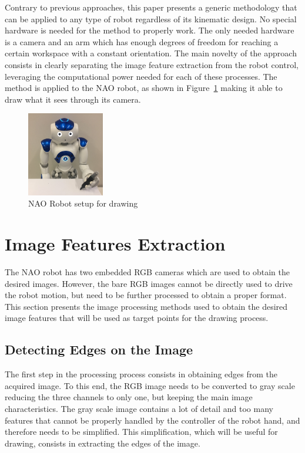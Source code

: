 \documentclass[conference]{IEEEtran}
\begin{document}
Contrary to previous approaches, this paper presents a generic methodology that can be applied to any type of robot regardless of its kinematic design. No special hardware is needed for the method to properly work. The only needed hardware is a camera and an arm which has enough degrees of freedom for reaching a certain workspace with a constant orientation. The main novelty of the approach consists in clearly separating the image feature extraction from the robot control, leveraging the computational power needed for each of these processes. The method is applied to the NAO robot, as shown in Figure~\ref{fig:nao} making it able to draw what it sees through its camera.
\begin{figure}
  \centering
  \captionsetup{font=footnotesize}
  \includegraphics[width=0.3\textwidth]{nao-setup.jpg}
  \caption{NAO Robot setup for drawing}
  \label{fig:nao}
\end{figure}

\section{Image Features Extraction}
\label{sec:methodology}

The NAO robot has two embedded RGB cameras which are used to obtain the desired images. However, the bare RGB images cannot be directly used to drive the robot motion, but need to be further processed to obtain a proper format. This section presents the image processing methods used to obtain the desired image features that will be used as target points for the drawing process.

\subsection{Detecting Edges on the Image}

The first step in the processing process consists in obtaining edges from the acquired image. To this end, the RGB image needs to be converted to gray scale reducing the three channels to only one, but keeping the main image characteristics. The gray scale image contains a lot of detail and too many features that cannot be properly handled by the controller of the robot hand, and therefore needs to be simplified. This simplification, which will be useful for drawing, consists in extracting the edges of the image.
\end{document}
